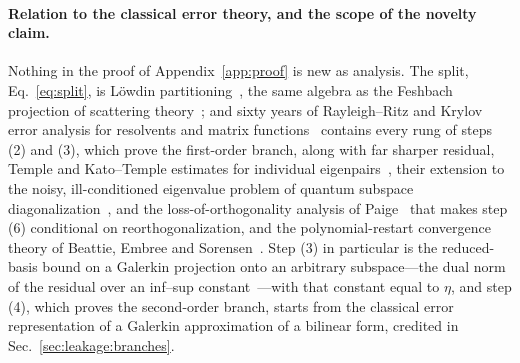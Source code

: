 \paragraph{Relation to the classical error theory, and the scope of the novelty claim.} Nothing in the
proof of Appendix~\ref{app:proof} is new as analysis. The split,
Eq.~\eqref{eq:split}, is L\"owdin partitioning~\cite{lowdin1962}, the same algebra as the Feshbach projection of scattering
theory~\cite{feshbach1958}; and sixty years of Rayleigh--Ritz and Krylov error analysis for resolvents
and matrix functions~\cite{saad2011,golub2010} contains every rung of steps (2) and (3), which prove the first-order branch,
along with far sharper residual, Temple and Kato--Temple estimates for individual
eigenpairs~\cite{temple1928,weinstein1934,kato1949}, their extension to the noisy, ill-conditioned
eigenvalue problem of quantum subspace diagonalization~\cite{epperly2022}, and the
loss-of-orthogonality analysis of Paige~\cite{paige1976} that makes step (6) conditional on
reorthogonalization, and the polynomial-restart convergence theory of Beattie, Embree and Sorensen~\cite{beattie2005}. Step (3) in particular is the reduced-basis bound on a Galerkin projection onto an arbitrary subspace---the dual norm of the residual over an inf--sup constant~\cite{rozza2008,hesthaven2016}---with that constant equal to $\eta$, and step (4), which proves the second-order branch, starts from the classical error representation of a Galerkin approximation of a bilinear form, credited in Sec.~\ref{sec:leakage:branches}.

